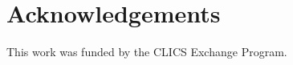 \documentclass[a4paper]{article}
\begin{document}
\section{Acknowledgements}
This work was funded by the CLICS Exchange Program.

\begin{comment}

The IWSLT 2015 organizing committee would like to thank the
organizing committees of INTERSPEECH 2004 for their
help and for kindly providing the template files.

\begin{itemize}
\item Proceedings will be printed in A4 format. The layout is designed 
so that files, when printed in US Letter format, include all material 
but margins are not symmetric. 
Although this is not an absolute requirement, if at all possible,
{\bf PLEASE TRY TO MAKE YOUR SUBMISSION IN A4 FORMAT.}
\item Two columns are used except for the title part and possibly for large 
figures that need a full page width.
\item Left margin is 20 mm.
\item Column width is 80 mm.
\item Spacing between columns is 10 mm.
\item Top margin 25 mm (except first page 30 mm to title top).
\item Text height (without headers and footers) is maximum 235 mm.
\item Headers and footers must be left empty (they will be added for 
printing).
\item Check indentations and spacings by comparing to this 
example file (in pdf format).
\end{itemize}



\subsubsection{Headings}

Section headings are centered in boldface
with the first word capitalized and the rest of the heading in 
lower case. Sub-headings appear like major headings, except they 
start at the left margin in the column.
Sub-sub-headings appear like sub-headings, except they are in italics 
and not boldface. See the examples given in this 
file. No more than 3 levels of headings should be used.


\end{comment}
\end{document}
